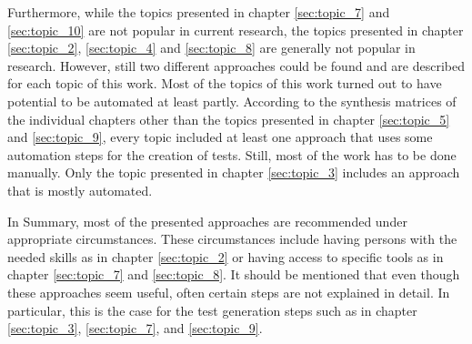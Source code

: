 Furthermore, while the topics presented in chapter \ref{sec:topic_7} and \ref{sec:topic_10} are not popular in current research, the topics presented in chapter \ref{sec:topic_2}, \ref{sec:topic_4} and \ref{sec:topic_8} are generally not popular in research. However, still two different approaches could be found and are described for each topic of this work. Most of the topics of this work turned out to have potential to be automated at least partly. According to the synthesis matrices of the individual chapters other than the topics presented in chapter \ref{sec:topic_5} and \ref{sec:topic_9}, every topic included at least one approach that uses some automation steps for the creation of tests. Still, most of the work has to be done manually. Only the topic presented in chapter \ref{sec:topic_3} includes an approach that is mostly automated.

In Summary, most of the presented approaches are recommended under appropriate circumstances. These circumstances include having persons with the needed skills as in chapter \ref{sec:topic_2} or having access to specific tools as in chapter \ref{sec:topic_7} and \ref{sec:topic_8}. It should be mentioned that even though these approaches seem useful, often certain steps are not explained in detail. In particular, this is the case for the test generation steps such as in chapter \ref{sec:topic_3}, \ref{sec:topic_7}, and \ref{sec:topic_9}. 
